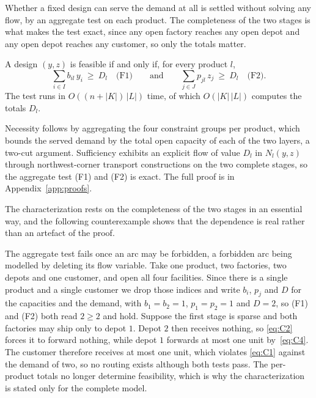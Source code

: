 Whether a fixed design can serve the demand at all is settled without
solving any flow, by an aggregate test on each product. The completeness
of the two stages is what makes the test exact, since any open factory
reaches any open depot and any open depot reaches any customer, so only
the totals matter.

\begin{proposition}[feasibility]\label{prop:feas}
A design $(y,z)$ is feasible if and only if, for every product $l$,
\begin{equation}
\textstyle\sum_{i\in I}b_{il}\,y_i\ \ge\ D_l
\quad\text{(F1)}\qquad\text{and}\qquad
\sum_{j\in J}p_{jl}\,z_j\ \ge\ D_l\quad\text{(F2)}.
\label{eq:feas}
\end{equation}
The test runs in $O((n+|K|)\,|L|)$ time, of which $O(|K|\,|L|)$ computes
the totals $D_l$.
\end{proposition}
Necessity follows by aggregating the four constraint groups per
product, which bounds the served demand by the total open capacity of
each of the two layers, a two-cut argument. Sufficiency exhibits an
explicit flow of value $D_l$ in $N_l(y,z)$ through northwest-corner
transport constructions on the two complete stages, so the aggregate
test (F1) and (F2) is exact. The full proof is in Appendix~\ref{app:proofs}.

The characterization rests on the completeness of the two stages in an
essential way, and the following counterexample shows that
the dependence is real rather than an artefact of the proof.

\begin{remark}\label{rem:sparse}
The aggregate test fails once an arc may be forbidden, a forbidden arc
being modelled by deleting its flow variable. Take one product, two
factories, two depots and one customer, and open all four facilities.
Since there is a single product and a single customer we drop those
indices and write $b_i$, $p_j$ and $D$ for the capacities and the
demand, with $b_1=b_2=1$, $p_1=p_2=1$ and $D=2$, so (F1) and (F2) both
read $2\ge 2$ and hold. Suppose the first stage is sparse and both
factories may ship only to depot $1$. Depot $2$ then receives nothing,
so \eqref{eq:C2} forces it to forward nothing, while depot $1$ forwards
at most one unit by~\eqref{eq:C4}. The customer therefore receives at
most one unit, which violates \eqref{eq:C1} against the demand of two,
so no routing exists although both tests pass. The per-product totals no
longer determine feasibility, which is why the characterization is
stated only for the complete model.
\end{remark}

